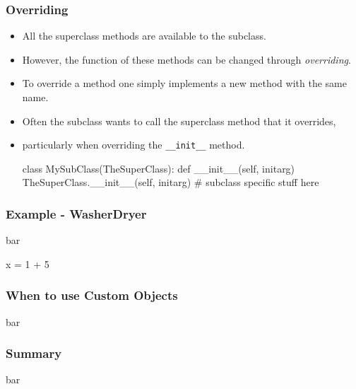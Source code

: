 \documentclass{beamer}
\begin{document}
\begin{frame}[fragile]
\frametitle{Overriding}

\begin{itemize}
\item All the superclass methods are available to the subclass.
\item However, the function of these methods can be changed through \emph{overriding}.
\item To override a method one simply implements a new method with the same name.
\item Often the subclass wants to call the superclass method that it overrides,
\item particularly when overriding the \lstinline|__init__| method.
\begin{code}
  class MySubClass(TheSuperClass):
    def __init__(self, initarg)
      TheSuperClass.__init__(self, initarg)
      # subclass specific stuff here
\end{code}
\end{itemize}

\end{frame}

\begin{frame}[fragile]
\frametitle{Example - WasherDryer}
bar
\begin{code}
x = 1 + 5
\end{code}

\end{frame}

\begin{frame}[fragile]
\frametitle{When to use Custom Objects}
bar


\end{frame}

\begin{frame}[fragile]
\frametitle{Summary}
bar


\end{frame}
\end{document}
